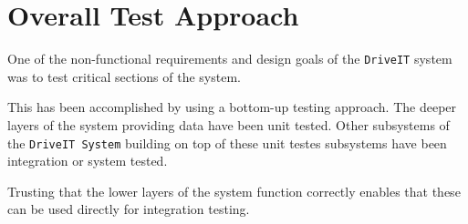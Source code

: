 \section{Overall Test Approach}
One of the non-functional requirements and design goals of the \texttt{DriveIT} system was to test critical sections of the system.

This has been accomplished by using a bottom-up testing approach. 
The deeper layers of the system providing data have been unit tested. Other subsystems of the \texttt{DriveIT System} building on top of these unit testes subsystems have been integration or system tested. 

Trusting that the lower layers of the system function correctly enables that these can be used directly for integration testing. 